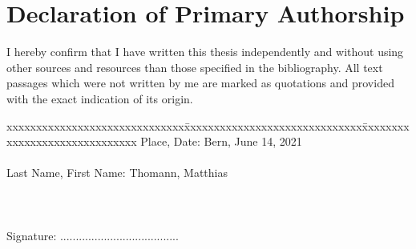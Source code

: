 \section{Declaration of Primary Authorship}

\vspace*{10mm} 

I hereby confirm that I have written this thesis independently and without using other sources and resources than those specified in the bibliography.
All text passages which were not written by me are marked as quotations and provided with the exact indication of its origin. 

\vspace{15mm}

\begin{tabbing}
xxxxxxxxxxxxxxxxxxxxxxxxxxxxxx\=xxxxxxxxxxxxxxxxxxxxxxxxxxxxxx\=xxxxxxxxxxxxxxxxxxxxxxxxxxxxxx\kill
Place, Date:		\> Bern, June 14, 2021 \\ \\ 
Last Name, First Name:	\> Thomann, Matthias \\ \\ \\ \\ 
Signature:	\> ......................................\\
\end{tabbing}